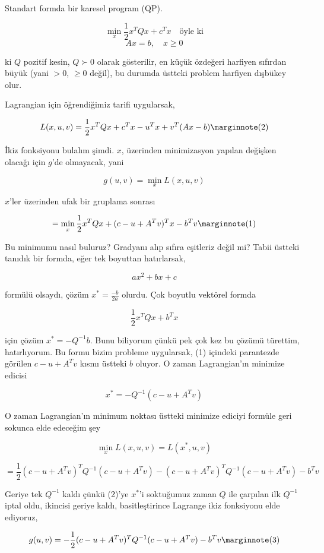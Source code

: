 \documentclass[12pt,fleqn]{article}\usepackage{../../common}
\begin{document}
Standart formda bir karesel program (QP). 

$$
\min_x \frac{1}{2} x^T Q x + c^T x \quad \textrm{öyle ki}
$$
$$
Ax = b, \quad x \ge 0
$$

ki $Q$ pozitif kesin, $Q \succ 0$ olarak gösterilir, en küçük özdeğeri
harfiyen sıfırdan büyük (yani $>0$, $\ge 0$ değil), bu durumda üstteki
problem harfiyen dışbükey olur.

Lagrangian için öğrendiğimiz tarifi uygularsak, 

$$
L(x,u,v) = \frac{1}{2} x^T Q x + c^Tx  - u^T x + v^T (Ax - b)
\mlabel{2}
$$

İkiz fonksiyonu bulalım şimdi. $x$, üzerinden minimizasyon yapılan değişken
olacağı için $g$'de olmayacak, yani

$$
g(u,v) = \min_x L(x,u,v) 
$$

$x$'ler üzerinden ufak bir gruplama sonrası

$$
= \min_x \frac{1}{2} x^T Q x + (c - u + A^T v)^T x - b^T v  
\mlabel{1}
$$

Bu minimumu nasıl buluruz? Gradyanı alıp sıfıra eşitleriz değil mi? Tabii
üstteki tanıdık bir formda, eğer tek boyuttan hatırlarsak, 

$$
ax^2 + bx + c
$$

formülü olsaydı, çözüm $x^\ast = \frac{-b}{2a}$ olurdu. Çok boyutlu vektörel
formda

$$
\frac{1}{2} x^T Q x + b^T x
$$

için çözüm $x^\ast = -Q^{-1} b$. Bunu biliyorum çünkü pek çok kez bu çözümü
türettim, hatırlıyorum. Bu formu bizim probleme uygularsak, (1) içindeki
parantezde görülen $c - u + A^T v$ kısmı üstteki $b$ oluyor. O zaman
Lagrangian'ın minimize edicisi

$$
x^\ast = -Q^{-1} (c - u + A^T v)
$$

O zaman Lagrangian'ın minimum noktası üstteki minimize ediciyi formüle geri
sokunca elde edeceğim şey

$$
\min_x L(x,u,v) = L(x^\ast,u,v)
$$

$$
= \frac{1}{2} 
(c - u + A^Tv)^T Q^{-1} (c - u + A^Tv) - 
(c - u + A^Tv)^T Q^{-1} (c - u + A^Tv) - b^T v
$$

Geriye tek $Q^{-1} $ kaldı çünkü (2)'ye $x^\ast$'i soktuğumuz zaman $Q$ ile
çarpılan ilk $Q^{-1} $ iptal oldu, ikincisi geriye kaldı, basitleştirince
Lagrange ikiz fonksiyonu elde ediyoruz,

$$
g(u,v) = -\frac{1}{2} (c - u + A^Tv)^T Q^{-1}  (c - u + A^Tv) - b^Tv
\mlabel{3}
$$
\end{document}
